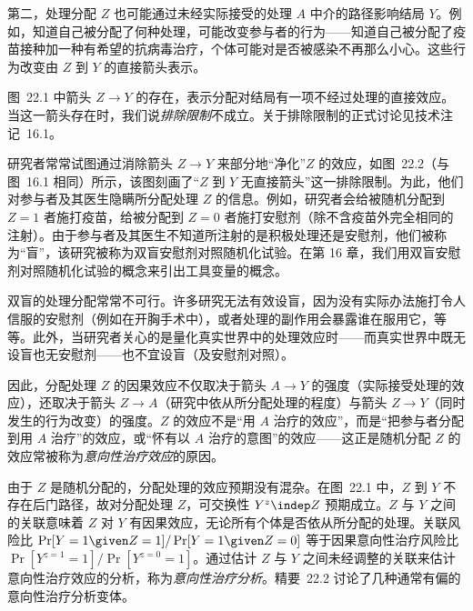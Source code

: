 第二，处理分配 $Z$ 也可能通过未经实际接受的处理 $A$ 中介的路径影响结局 $Y$。例如，知道自己被分配了何种处理，可能改变参与者的行为——知道自己被分配了疫苗接种加一种有希望的抗病毒治疗，个体可能对是否被感染不再那么小心。这些行为改变由 $Z$ 到 $Y$ 的直接箭头表示。

\begin{finepoint}[排除限制（再论）]
图~22.1 中箭头 $Z\to Y$ 的存在，表示分配对结局有一项不经过处理的直接效应。当这一箭头存在时，我们说\emph{排除限制}不成立。关于排除限制的正式讨论见技术注记~16.1。

研究者常常试图通过消除箭头 $Z\to Y$ 来部分地“净化”$Z$ 的效应，如图~22.2（与图~16.1 相同）所示，该图刻画了“$Z$ 到 $Y$ 无直接箭头”这一排除限制。为此，他们对参与者及其医生隐瞒所分配处理 $Z$ 的信息。例如，研究者会给被随机分配到 $Z=1$ 者施打疫苗，给被分配到 $Z=0$ 者施打安慰剂（除不含疫苗外完全相同的注射）。由于参与者及其医生不知道所注射的是积极处理还是安慰剂，他们被称为“盲”，该研究被称为双盲安慰剂对照随机化试验。在第 16 章，我们用双盲安慰剂对照随机化试验的概念来引出工具变量的概念。

双盲的处理分配常常不可行。许多研究无法有效设盲，因为没有实际办法施打令人信服的安慰剂（例如在开胸手术中），或者处理的副作用会暴露谁在服用它，等等。此外，当研究者关心的是量化真实世界中的处理效应时——而真实世界中既无设盲也无安慰剂——也不宜设盲（及安慰剂对照）。
\end{finepoint}

\begin{figure}[htbp]
\centering
{}
\caption{}
\label{fig:22.2}
\end{figure}

因此，分配处理 $Z$ 的因果效应不仅取决于箭头 $A\to Y$ 的强度（实际接受处理的效应），还取决于箭头 $Z\to A$（研究中依从所分配处理的程度）与箭头 $Z\to Y$（同时发生的行为改变）的强度。$Z$ 的效应不是“用 $A$ 治疗的效应”，而是“把参与者分配到用 $A$ 治疗”的效应，或“怀有以 $A$ 治疗的意图”的效应——这正是随机分配 $Z$ 的效应常被称为\emph{意向性治疗效应}的原因。

由于 $Z$ 是随机分配的，分配处理的效应预期没有混杂。在图~22.1 中，$Z$ 到 $Y$ 不存在后门路径，故对分配处理 $Z$，可交换性 $Y^{z}\indep Z$ 预期成立。$Z$ 与 $Y$ 之间的关联意味着 $Z$ 对 $Y$ 有因果效应，无论所有个体是否依从所分配的处理。关联风险比 $\Pr[Y=1\given Z=1]/\Pr[Y=1\given Z=0]$ 等于因果意向性治疗风险比 $\Pr[Y^{z=1}=1]/\Pr[Y^{z=0}=1]$。通过估计 $Z$ 与 $Y$ 之间未经调整的关联来估计意向性治疗效应的分析，称为\emph{意向性治疗分析}。精要~22.2 讨论了几种通常有偏的意向性治疗分析变体。

